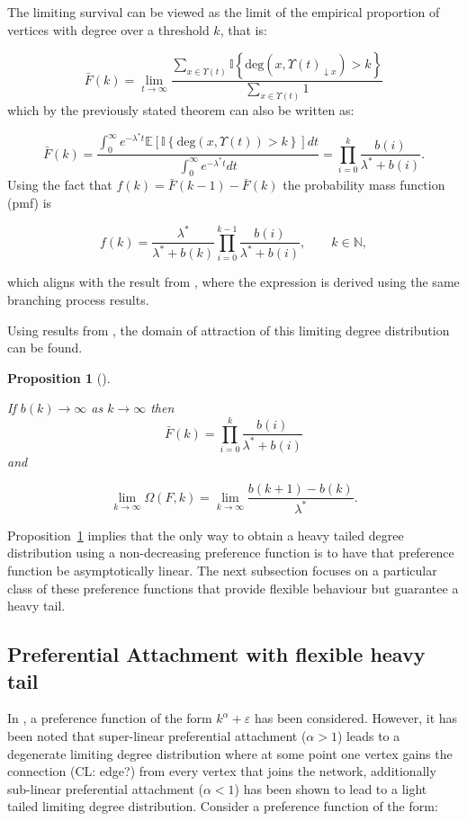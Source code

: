 \documentclass[
  sn-basic,
]{sn-jnl}
\theoremstyle{plain}
\newtheorem{proposition}{Proposition}[section]
\theoremstyle{remark}
\begin{document}
The limiting survival can be viewed as the limit of the empirical
proportion of vertices with degree over a threshold \(k\), that is:

\[
\bar F(k) = \lim_{t\rightarrow\infty}\frac{\sum_{x\in\Upsilon(t)}\mathbb I\left\{\text{deg}(x,\Upsilon(t)_{\downarrow x})>k\right\}}{\sum_{x\in\Upsilon(t)} 1}
\] which by the previously stated theorem can also be written as:

\[
\bar F(k) = \frac{\int_0^\infty e^{-\lambda^* t}\mathbb E\left[\mathbb I\left\{\text{deg}(x,\Upsilon(t))>k\right\}\right]dt}{\int_0^\infty e^{-\lambda^* t}dt} = \prod_{i=0}^k\frac{b(i)}{\lambda^* + b(i)}.
\] Using the fact that \(f(k) = \bar F(k-1) - \bar F(k)\) the
probability mass function (pmf) is

\[
f(k) = \frac{\lambda^*}{\lambda^* + b(k)}\prod_{i=0}^{k-1}\frac{b(i)}{\lambda^*+b(i)},\qquad k\in\mathbb N,
\]

which aligns with the result from \citet{rudas07}, where the expression
is derived using the same branching process results.

Using results from \citet{shimura12}, the domain of attraction of this
limiting degree distribution can be found.

\begin{proposition}[]\protect\hypertarget{prp-omega}{}\label{prp-omega}

If \(b(k) \rightarrow \infty\) as \(k\rightarrow \infty\) then \[
\bar F(k) = \prod_{i=0}^k\frac{b(i)}{\lambda^* + b(i)}
\] and

\[
\lim_{k\rightarrow\infty}\Omega(F,k) = \lim_{k\rightarrow\infty}\frac{b(k+1)-b(k)}{\lambda^*}.
\]

\end{proposition}

Proposition~\ref{prp-omega} implies that the only way to obtain a heavy
tailed degree distribution using a non-decreasing preference function is
to have that preference function be asymptotically linear. The next
subsection focuses on a particular class of these preference functions
that provide flexible behaviour but guarantee a heavy tail.

\subsection{Preferential Attachment with flexible heavy
tail}\label{sec-model}

In \citet{krapivsky01}, a preference function of the form
\(k^\alpha +\varepsilon\) has been considered. However, it has been
noted that super-linear preferential attachment (\(\alpha > 1\)) leads
to a degenerate limiting degree distribution where at some point one
vertex gains the connection (CL: edge?) from every vertex that joins the
network, additionally sub-linear preferential attachment (\(\alpha <1\))
has been shown to lead to a light tailed limiting degree distribution.
Consider a preference function of the form:
\end{document}
